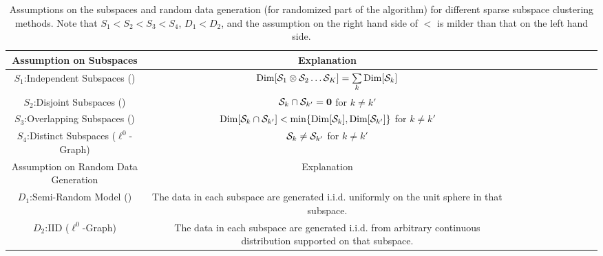 \documentclass[10pt,twocolumn,letterpaper]{article}
\begin{document}
\begin{table*}[ht]
\centering
\footnotesize
\caption{Assumptions on the subspaces and random data generation (for randomized part of the algorithm) for different sparse subspace clustering methods. Note that $S_1 < S_2 < S_3 < S_4$, $D_1 < D_2$, and the assumption on the right hand side of $<$ is milder than that on the left hand side.}
\begin{tabular}{|c|c|c|c|c|c|c|c|c|c|c|}
  \hline
  Assumption on Subspaces                           &Explanation            \\\hline
  $S_1$:Independent Subspaces (\cite{LiuLY10,Liu12}) &  ${\rm Dim} [\mathcal{S}_1 \otimes \mathcal{S}_2 \ldots \mathcal{S}_K] = \sum\limits_k {\rm Dim}[\mathcal{S}_k]$                        \\ \hline
  $S_2$:Disjoint Subspaces (\cite{ElhamifarV13})            & $\mathcal{S}_k \cap \mathcal{S}_{k'} = \mathbf 0$ for $k \neq k'$                             \\ \hline
  $S_3$:Overlapping Subspaces  (\cite{ParkCS14,Wang13,Soltanolkotabi2012})        &  ${\rm Dim} [\mathcal{S}_k \cap \mathcal{S}_{k'}] < \min\{{\rm Dim}[\mathcal{S}_k],{\rm Dim}[\mathcal{S}_{k'}]\}$ for $k \neq k'$   \\ \hline
  $S_4$:Distinct Subspaces  ($\ell^{0}$-Graph)          &$\mathcal{S}_k \neq \mathcal{S}_{k'}$ for $k \neq k'$                        \\ \hline\hline
  Assumption on Random Data Generation  &Explanation \\\hline
  $D_1$:Semi-Random Model   (\cite{ParkCS14,Wang13,Soltanolkotabi2012})           &The data in each subspace are generated i.i.d. uniformly on the unit sphere in that subspace. \\ \hline
  $D_2$:IID      ($\ell^{0}$-Graph)                     &The data in each subspace are generated i.i.d. from arbitrary continuous distribution supported on that subspace. \\ \hline
\end{tabular}
\label{table:assumptions}
\end{table*}
\end{document}
